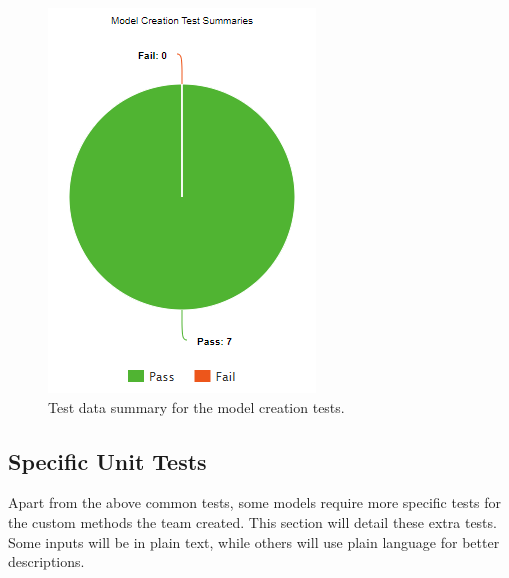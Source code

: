 \documentclass[12pt, titlepage]{article}
\begin{document}
\begin{figure}[H]
    \centering
    \includegraphics{./model_creation_pie_chart.png}
    \caption{Test data summary for the model creation tests.}
    \label{fig:creation_chart}
\end{figure}

\subsection{Specific Unit Tests}

Apart from the above common tests, some models require more specific tests for the custom methods the team created. This section will detail these extra tests. Some inputs will be in plain text, while others will use plain language for better descriptions.
\end{document}
